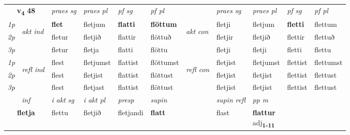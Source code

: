\noindent
\begin{tabular}{lllllllllll} \toprule
\multicolumn{2}{c}{\textbf{v{\textsubscript{4}}} \Large{\textbf{48}}}  &  \textit{praes sg}  & \textit{praes pl}  &\textit{ pf sg} & \textit{pf pl} &  &  \textit{praes sg}  & \textit{praes pl}  & \textit{pf sg} & \textit{pf pl } \\*
	\cmidrule{3-6} \cmidrule{8-11}
 {\textit{1p}} & \multirow{3}{*}{\begin{turn}{90}\textit{akt ind}\end{turn}} & \textbf{flet} & fletjum & \textbf{flatti} & \textbf{flöttum} & \multirow{3}{*}{\begin{turn}{90}\textit{akt con}\end{turn}} &fletji & fletjum & \textbf{fletti} & flettum\\*
 {\textit{2p}} &  &  fletur  & fletjið & flattir & flöttuð & & fletjir & fletjið & flettir & flettuð \\*
{\textit{3p}} &  & fletur & fletja & flatti & flöttu & & fletji & fletji& fletti & flettu \\*
\cmidrule{3-6} \cmidrule{8-11}
 {\textit{1p}} & \multirow{3}{*}{\begin{turn}{90}\textit{refl ind}\end{turn}}  & flest & fletjumst & flattist & flöttumst & \multirow{3}{*}{\begin{turn}{90}\textit{refl con}\end{turn}}  &fletjist & fletjumst & flettist & flettumst \\*
 {\textit{2p}} &  & flest & fletjist & flattist & flöttust & &fletjist & fletjist & flettist & flettust \\*
 {\textit{3p}}  & & flest & fletjast & flattist & flöttust & & fletjist & fletjist& flettist & flettust \\*
\cmidrule{3-6} \cmidrule{8-11}

   \multicolumn{2}{c}{\textit{inf}}  & \textit{i akt sg} & \textit{i akt pl}   & \textit{presp} & \textit{supin} && \textit{supin refl} & \textit{pp m} \\*
  \multicolumn{2}{c}{\textbf{fletja}} & flettu  & fletjið   & fletjandi &  \textbf{flatt} && flast & \specialcell{\textbf{flattur} \\ adj\textbf{\textsubscript{1-11}}} \\*
\end{tabular}

